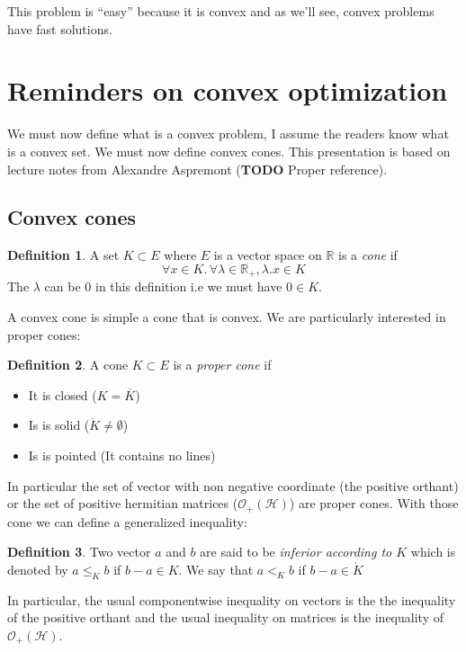 \documentclass[10pt]{report}
\theoremstyle{plain}
\theoremstyle{definition}
\newtheorem{defn}{Definition}[chapter]
\theoremstyle{remark}
\newcommand{\R}{\ensuremath{\mathbb{R}}}
\newcommand{\TODO}{\textbf{TODO}}
\renewcommand{\leq}{\leqslant}
\begin{document}
This problem is ``easy'' because it is convex and as we'll see, convex problems
have fast solutions.

\section{Reminders on convex optimization}

We must now define what is a convex problem, I assume the readers know what is a
convex set. We must now define convex cones. This presentation is based on
lecture notes from Alexandre Aspremont (\TODO{} Proper reference).

\subsection{Convex cones}

\begin{defn}
  A set $K \subset E$ where $E$ is a vector space on $\R$ is a \emph{cone} if
  \[\forall x \in K.\, \forall \lambda \in \R_+, \lambda.x  \in K\]
  The $\lambda$ can be 0 in this definition i.e we must have $0 \in K$.
\end{defn}

A convex cone is simple a cone that is convex. We are particularly interested in
proper cones:

\begin{defn}
  A cone $K \subset E$ is a \emph{proper cone} if
  \begin{itemize}
    \item It is closed ($K = \overline K$)
    \item Is is solid ($ \mathring K \neq \emptyset$)
    \item Is is pointed (It contains no lines)
  \end{itemize}
\end{defn}

In particular the set of vector with non negative coordinate (the positive orthant) or the set of
positive hermitian matrices ($\mathcal{O}_+(\mathcal{H})$) are proper cones. With those cone we can define a
generalized inequality:

\begin{defn}
  Two vector $a$ and $b$ are said to be \emph{inferior according to $K$} which is denoted by $a
  \leq_K b$ if $b - a \in K$. We say that $a <_K b$ if $b - a \in \mathring K$
\end{defn}

In particular, the usual componentwise inequality on vectors is the the
inequality of the positive orthant and the usual inequality on matrices is the
inequality of $\mathcal{O}_+(\mathcal{H})$.
\end{document}
